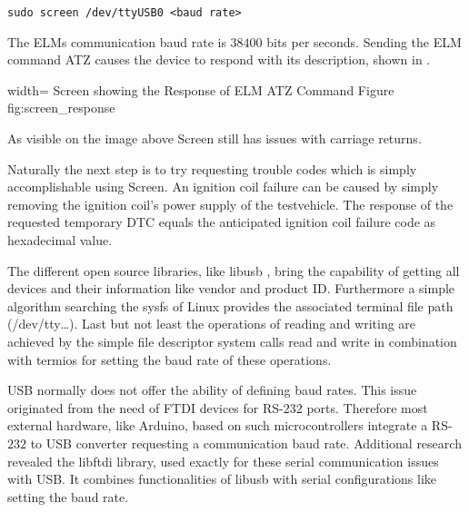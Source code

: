 \begin{verbatim}
sudo screen /dev/ttyUSB0 <baud rate> 
\end{verbatim}

The ELMs communication baud rate is $38400$ bits per seconds. Sending the ELM command ATZ causes the device to respond with its description, shown in .

 {width=\textwidth}%
 {Screen showing the Response of ELM ATZ Command}%
 {Figure}%
 {fig:screen_response}%

As visible on the image above Screen still has issues with carriage returns.

Naturally the next step is to try requesting trouble codes which is simply accomplishable using Screen. An ignition coil failure can be
caused by simply removing the ignition coil's power supply of the testvehicle. The response of the requested temporary DTC equals the anticipated 
ignition coil failure code as hexadecimal value. 


The different open source libraries, like libusb \cite{LIBUSB}, bring the capability of getting all devices and their information like vendor and product ID.
Furthermore a simple algorithm searching the sysfs of Linux provides the associated terminal file path (/dev/tty…). Last but not least the 
operations of reading and writing are achieved by the simple file descriptor system calls read and write in combination with termios for 
setting the baud rate of these operations. 

USB normally does not offer the ability of defining baud rates. This issue originated from the need of FTDI devices for RS-$232$ ports. Therefore most
external hardware, like Arduino, based on such microcontrollers integrate a RS-$232$ to USB converter requesting a communication baud rate. Additional 
research revealed the libftdi library, used exactly for these serial communication issues with USB. It combines functionalities of libusb with serial
configurations like setting the baud rate. 

